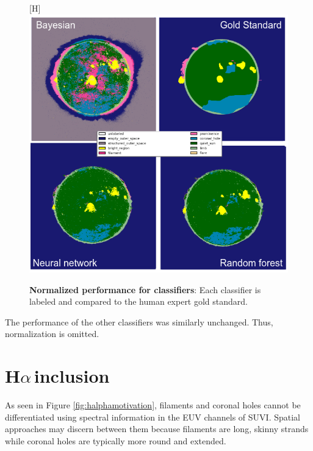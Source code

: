 \documentclass[twoside]{report}
\newcommand{\halpha}{H$\alpha$\,}
\begin{document}
\begin{figure}
  \begin{center}[H]
    \includegraphics[scale=0.6]{normcomp}
    \caption{{\bf Normalized performance for classifiers}: Each classifier is labeled and compared to the human expert gold standard.}
    \label{fig:normbayes}
 \end{center}
\end{figure}

The performance of the other classifiers was similarly unchanged. Thus, normalization is omitted. 

\newpage

\section{\halpha inclusion}\label{sec:halphainclusion}
As seen in Figure \ref{fig:halphamotivation}, filaments and coronal holes cannot be differentiated using spectral information in the EUV channels of SUVI. Spatial approaches may discern between them because filaments are long, skinny strands while coronal holes are typically more round and extended. 
\end{document}
